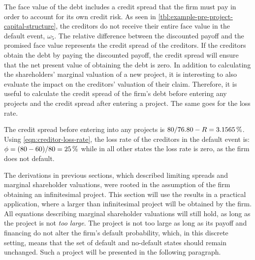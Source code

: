 \documentclass[main.tex]{subfiles}
\begin{document}
    The face value of the debt includes a credit spread that the firm must pay in order to account for its own credit risk.
    As seen in \cref{tbl:example-pre-project-capital-structure},
    the creditors do not receive their entire face value in the default event, $\omega_5$.
    The relative difference between the discounted payoff and the promised face value
    represents the credit spread of the creditors.
    If the creditors obtain the debt by paying the discounted payoff,
    the credit spread will ensure that the net present value of obtaining the debt is zero.
    In addition to calculating the shareholders' marginal valuation of a new project,
    it is interesting to also evaluate the impact on the creditors' valuation of their claim. 
    Therefore, it is useful to calculate the credit spread of the firm's debt 
    before entering any projects and the credit spread after entering a project.
    The same goes for the loss rate.

    The credit spread before entering into any projects is 
    $\num{80}/\num{76.80} - \grossrfrate = \pct{0.031565}$.
    Using \cref{eqn:creditor-loss-rate}, the loss rate of the creditors in the default event is:
    $\phi = (\num{80}-\num{60})/\num{80} = \pct{0.25}$
    while in all other states the loss rate is zero, as the firm does not default.

    The derivations in previous sections, 
    which described limiting spreads and marginal shareholder valuations, 
    were rooted in the assumption of the firm obtaining an infinitesimal project.
    This section will use the results in a practical application,
    where a larger than infinitesimal project will be obtained by the firm.
    All equations describing marginal shareholder valuations will still hold,
    as long as the project is not \textit{too large}.
    The project is not too large as long as its payoff and financing do not 
    alter the firm's default probability, which, in this discrete setting, means
    that the set of default and no-default states should remain unchanged.
    Such a project will be presented in the following paragraph.
    
\end{document}

